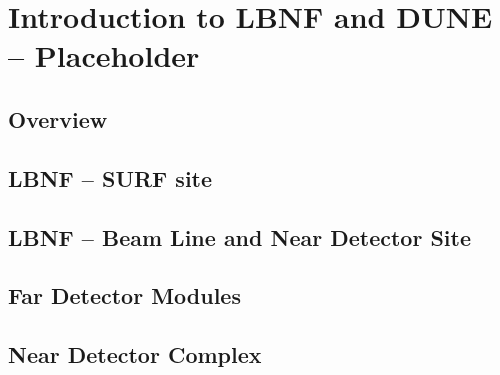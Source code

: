\chapter{Introduction to LBNF and DUNE -- Placeholder}
\label{ch:physics-intro}


\section{Overview}
\section{LBNF -- SURF site}
\section{LBNF -- Beam Line and Near Detector Site}
\section{Far Detector Modules}
\section{Near Detector Complex}


